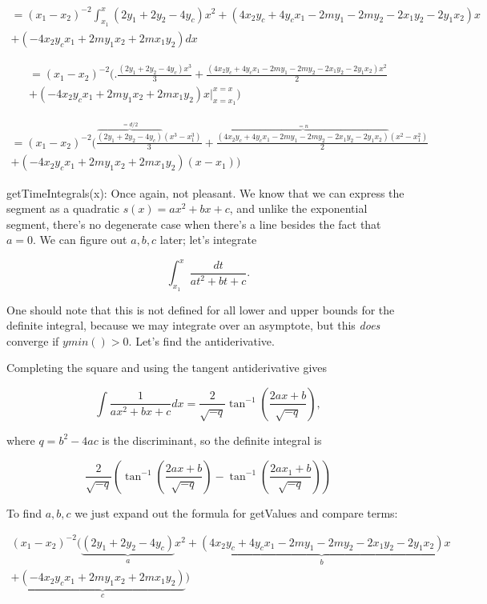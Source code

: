 \documentclass{article}
\begin{document}
\begin{multline*}
=(x_1-x_2)^{-2} \int_{x_1}^x (2y_1+2y_2-4y_c)x^2 + (4 x_2 y_c + 4 y_c x_1 - 2 m y_1 - 2 m y_2 - 2 x_1 y_2 - 2 y_1 x_2) x \\ + (-4 x_2 y_c x_1 + 2 m y_1 x_2 + 2 m x_1 y_2) dx
\end{multline*}

\begin{multline*}
=(x_1-x_2)^{-2} \biggl(\bigl.\frac{(2y_1+2y_2-4y_c)x^3}{3} + \frac{(4 x_2 y_c + 4 y_c x_1 - 2 m y_1 - 2 m y_2 - 2 x_1 y_2 - 2 y_1 x_2) x^2}{2} \\ + (-4 x_2 y_c x_1 + 2 m y_1 x_2 + 2 m x_1 y_2)x\bigr\vert _ {x=x_1} ^ {x=x}\biggr)
\end{multline*}

\begin{multline*}
=(x_1-x_2)^{-2} \biggl(\frac{\overbrace{(2y_1+2y_2-4y_c)}^{=d/2}(x^3-x_1^3)}{3} + \frac{\overbrace{(4 x_2 y_c + 4 y_c x_1 - 2 m y_1 - 2 m y_2 - 2 x_1 y_2 - 2 y_1 x_2)}^{=n} (x^2-x_1^2)}{2} \\ + (-4 x_2 y_c x_1 + 2 m y_1 x_2 + 2 m x_1 y_2)(x-x_1)\biggr)
\end{multline*}

getTimeIntegrals(x): Once again, not pleasant. We know that we can express the segment as a quadratic $s(x)=ax^2+bx+c$, and unlike the exponential segment, there's no degenerate case when there's a line besides the fact that $a=0$. We can figure out $a,b,c$ later; let's integrate

$$\int_{x_1}^x \frac{dt}{at^2+bt+c}.$$

One should note that this is not defined for all lower and upper bounds for the definite integral, because we may integrate over an asymptote, but this \textit{does} converge if $ymin() > 0$. Let's find the antiderivative.

Completing the square and using the tangent antiderivative gives

$$\int \frac{1}{ax^2+bx+c}dx = \frac{2}{\sqrt{-q}}\tan^{-1}\left(\frac{2ax+b}{\sqrt{-q}}\right),$$

where $q=b^2-4ac$ is the discriminant, so the definite integral is

$$\frac{2}{\sqrt{-q}}\left(\tan^{-1}\left(\frac{2ax+b}{\sqrt{-q}}\right)-\tan^{-1}\left(\frac{2ax_1+b}{\sqrt{-q}}\right)\right)$$

To find $a,b,c$ we just expand out the formula for getValues and compare terms:

\begin{multline*}
(x_1-x_2)^{-2}(\underbrace{(2y_1+2y_2-4y_c)}_ax^2 + \underbrace{(4 x_2 y_c + 4 y_c x_1 - 2 m y_1 - 2 m y_2 - 2 x_1 y_2 - 2 y_1 x_2)}_b x \\ + \underbrace{(-4 x_2 y_c x_1 + 2 m y_1 x_2 + 2 m x_1 y_2)}_c)
\end{multline*}
\end{document}
